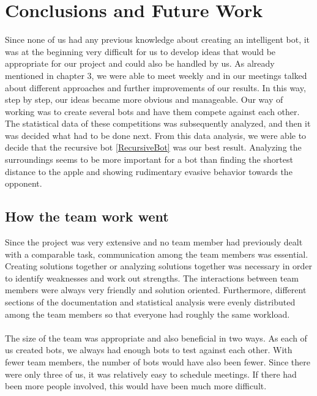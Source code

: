 \documentclass[a4paper,12pt]{article}
\begin{document}
\section{Conclusions and Future Work}
Since none of us had any previous knowledge about creating an intelligent bot, it was at the beginning very difficult for us to develop ideas that would be appropriate for our project and could also be handled by us. As already mentioned in chapter 3, we were able to meet weekly and in our meetings talked about different approaches and further improvements of our results. In this way, step by step, our ideas became more obvious and  manageable. Our way of working was to create several bots and have them compete against each other.  The statistical data of these competitions was subsequently analyzed, and then it was decided what had to be done next. From this data analysis, we were able to decide that the recursive bot \ref{RecursiveBot} was our best result. Analyzing the surroundings seems to be more important for a bot than finding the shortest distance to the apple and showing rudimentary evasive behavior towards the opponent.  
\subsection{How the team work went}

Since the project was very extensive and no team member had previously dealt with a comparable task, communication among the team members was essential. Creating solutions together or analyzing solutions together was necessary in order to identify weaknesses and work out strengths. The interactions between team members were always very friendly and solution oriented. Furthermore, different sections of the documentation and statistical analysis were evenly distributed among the team members so that everyone had roughly the same workload.\\
\\The size of the team was appropriate and also beneficial in two ways.  As each of us created bots, we always had enough bots to test against each other. With fewer team members, the number of bots would have also been fewer. Since there were only three of us, it was relatively easy to schedule meetings. If there had been more people involved, this would have been much more difficult. 
\end{document}

